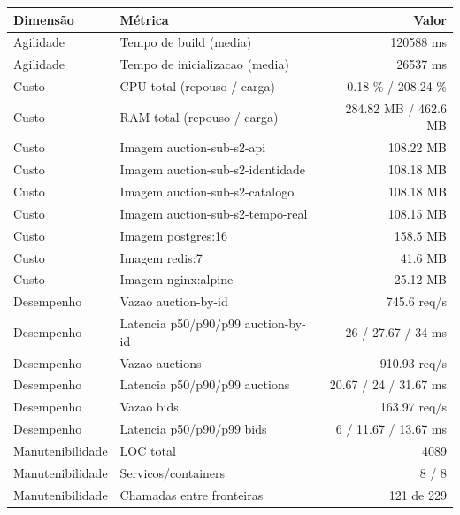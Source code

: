 \begin{quadro}[htb]
  \centering
  \caption{Métricas (auction, subdominio, snapshot-2).}
  \label{qua:metricas-auction-subdominio-snapshot-2}
  \renewcommand{\arraystretch}{1.15}
  \begin{tabular}{|l|l|r|}
    \hline
    \textbf{Dimensão} & \textbf{Métrica} & \textbf{Valor} \\
    \hline
    Agilidade & Tempo de build (media) & 120588 ms \\ \hline
    Agilidade & Tempo de inicializacao (media) & 26537 ms \\ \hline
    Custo & CPU total (repouso / carga) & 0.18 \% / 208.24 \% \\ \hline
    Custo & RAM total (repouso / carga) & 284.82 MB / 462.6 MB \\ \hline
    Custo & Imagem auction-sub-s2-api & 108.22 MB \\ \hline
    Custo & Imagem auction-sub-s2-identidade & 108.18 MB \\ \hline
    Custo & Imagem auction-sub-s2-catalogo & 108.18 MB \\ \hline
    Custo & Imagem auction-sub-s2-tempo-real & 108.15 MB \\ \hline
    Custo & Imagem postgres:16 & 158.5 MB \\ \hline
    Custo & Imagem redis:7 & 41.6 MB \\ \hline
    Custo & Imagem nginx:alpine & 25.12 MB \\ \hline
    Desempenho & Vazao auction-by-id & 745.6 req/s \\ \hline
    Desempenho & Latencia p50/p90/p99 auction-by-id & 26 / 27.67 / 34 ms \\ \hline
    Desempenho & Vazao auctions & 910.93 req/s \\ \hline
    Desempenho & Latencia p50/p90/p99 auctions & 20.67 / 24 / 31.67 ms \\ \hline
    Desempenho & Vazao bids & 163.97 req/s \\ \hline
    Desempenho & Latencia p50/p90/p99 bids & 6 / 11.67 / 13.67 ms \\ \hline
    Manutenibilidade & LOC total & 4089 \\ \hline
    Manutenibilidade & Servicos/containers & 8 / 8 \\ \hline
    Manutenibilidade & Chamadas entre fronteiras & 121 de 229 \\ \hline
  \end{tabular}
\end{quadro}
